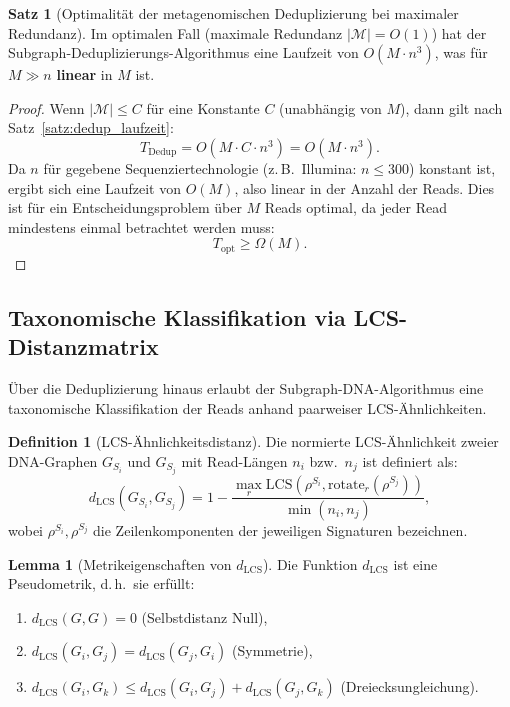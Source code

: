 ﻿\documentclass[a4paper,12pt]{article}
\theoremstyle{definition}
\newtheorem{definition}{Definition}
\newtheorem{satz}{Satz}
\newtheorem{lemma}{Lemma}
\begin{document}
\begin{satz}[Optimalität der metagenomischen Deduplizierung bei maximaler Redundanz]
	\label{satz:meta_optimal}
	Im optimalen Fall (maximale Redundanz $|\mathcal{M}| = O(1)$) hat der
	Subgraph-Deduplizierungs-Algorithmus eine Laufzeit von $O(M \cdot n^3)$,
	was für $M \gg n$ \textbf{linear} in $M$ ist.
\end{satz}

\begin{proof}
	Wenn $|\mathcal{M}| \leq C$ für eine Konstante $C$ (unabhängig von $M$),
	dann gilt nach Satz~\ref{satz:dedup_laufzeit}:
	\[
	T_{\text{Dedup}} = O(M \cdot C \cdot n^3) = O(M \cdot n^3).
	\]
	Da $n$ für gegebene Sequenziertechnologie (z.\,B.\ Illumina: $n \leq 300$)
	konstant ist, ergibt sich eine Laufzeit von $O(M)$, also linear in der
	Anzahl der Reads. Dies ist für ein Entscheidungsproblem über $M$ Reads
	optimal, da jeder Read mindestens einmal betrachtet werden muss:
	\[
	T_{\text{opt}} \geq \Omega(M).
	\]
\end{proof}

\subsection{Taxonomische Klassifikation via LCS-Distanzmatrix}

Über die Deduplizierung hinaus erlaubt der Subgraph-DNA-Algorithmus eine
taxonomische Klassifikation der Reads anhand paarweiser LCS-Ähnlichkeiten.

\begin{definition}[LCS-Ähnlichkeitsdistanz]
	Die normierte LCS-Ähnlichkeit zweier DNA-Graphen $G_{S_i}$ und
	$G_{S_j}$ mit Read-Längen $n_i$ bzw.\ $n_j$ ist definiert als:
	\[
	d_{\mathrm{LCS}}(G_{S_i}, G_{S_j}) = 1 -
	\frac{\max_{r} \mathrm{LCS}(\rho^{S_i},
		\mathrm{rotate}_r(\rho^{S_j}))}{\min(n_i, n_j)},
	\]
	wobei $\rho^{S_i}, \rho^{S_j}$ die Zeilenkomponenten der jeweiligen
	Signaturen bezeichnen.
\end{definition}

\begin{lemma}[Metrikeigenschaften von $d_{\mathrm{LCS}}$]
	\label{lem:metrik}
	Die Funktion $d_{\mathrm{LCS}}$ ist eine Pseudometrik, d.\,h.\ sie
	erfüllt:
	\begin{enumerate}
		\item $d_{\mathrm{LCS}}(G, G) = 0$ (Selbstdistanz Null),
		\item $d_{\mathrm{LCS}}(G_i, G_j) = d_{\mathrm{LCS}}(G_j, G_i)$
		(Symmetrie),
		\item $d_{\mathrm{LCS}}(G_i, G_k) \leq
		d_{\mathrm{LCS}}(G_i, G_j) + d_{\mathrm{LCS}}(G_j, G_k)$
		(Dreiecksungleichung).
	\end{enumerate}
\end{lemma}
\end{document}
